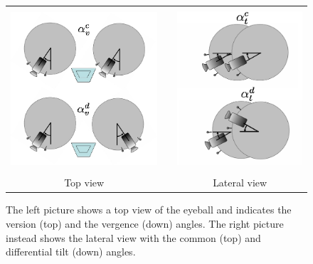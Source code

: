 \begin{figure}
  \begin{center}
  \begin{tabular}{ccc}
  \parbox{60mm}{\includegraphics[height=60mm]{Figure/EyeVergenceVersion.jpg}}  & &
  \parbox{60mm}{\includegraphics[height=60mm]{Figure/EyeCommDiffTilt.jpg}}\\
  Top view & & Lateral view
  \end{tabular}
  \end{center}
  \caption{The left picture shows a top view of the eyeball and indicates the version (top) and the vergence (down) angles. The right picture instead shows the lateral view with the common (top) and differential tilt (down) angles.}\label{Fig:EyeCoordinatedMovements}
 \end{figure}

